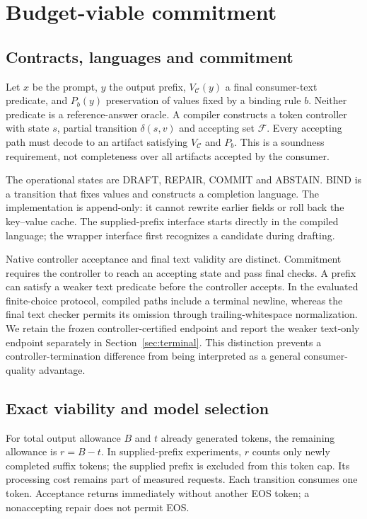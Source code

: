 \documentclass[12pt,a4paper]{article}
\begin{document}
\section{Budget-viable commitment}\label{sec:method}
\subsection{Contracts, languages and commitment}\label{sec:contract}
Let $x$ be the prompt, $y$ the output prefix, $V_{\mathcal C}(y)$ a final consumer-text predicate, and $P_b(y)$ preservation of values fixed by a binding rule $b$. Neither predicate is a reference-answer oracle. A compiler constructs a token controller with state $s$, partial transition $\delta(s,v)$ and accepting set $\mathcal F$. Every accepting path must decode to an artifact satisfying $V_{\mathcal C}$ and $P_b$. This is a soundness requirement, not completeness over all artifacts accepted by the consumer.

The operational states are DRAFT, REPAIR, COMMIT and ABSTAIN. BIND is a transition that fixes values and constructs a completion language. The implementation is append-only: it cannot rewrite earlier fields or roll back the key--value cache. The supplied-prefix interface starts directly in the compiled language; the wrapper interface first recognizes a candidate during drafting.

Native controller acceptance and final text validity are distinct. Commitment requires the controller to reach an accepting state and pass final checks. A prefix can satisfy a weaker text predicate before the controller accepts. In the evaluated finite-choice protocol, compiled paths include a terminal newline, whereas the final text checker permits its omission through trailing-whitespace normalization. We retain the frozen controller-certified endpoint and report the weaker text-only endpoint separately in Section~\ref{sec:terminal}. This distinction prevents a controller-termination difference from being interpreted as a general consumer-quality advantage.

\subsection{Exact viability and model selection}\label{sec:viability}
For total output allowance $B$ and $t$ already generated tokens, the remaining allowance is $r=B-t$. In supplied-prefix experiments, $r$ counts only newly completed suffix tokens; the supplied prefix is excluded from this token cap. Its processing cost remains part of measured requests. Each transition consumes one token. Acceptance returns immediately without another EOS token; a nonaccepting repair does not permit EOS.
\end{document}
